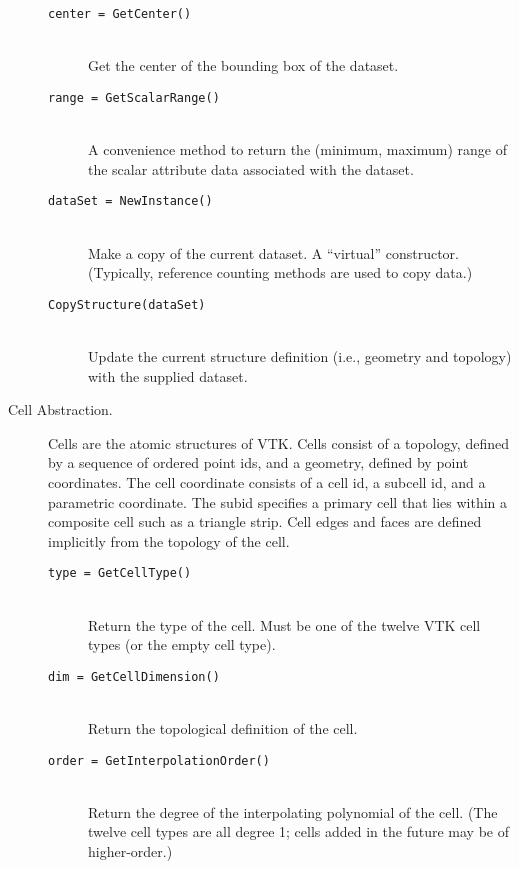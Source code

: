 \begin{description}
\begin{description}
    \item[\texttt{center = GetCenter()}] \hfill \\
    Get the center of the bounding box of the dataset.

    \item[\texttt{range = GetScalarRange()}] \hfill \\
    A convenience method to return the (minimum, maximum) range of the scalar attribute data associated with the dataset.

    \item[\texttt{dataSet = NewInstance()}] \hfill \\
    Make a copy of the current dataset. A ``virtual'' constructor. (Typically, reference counting methods are used to copy data.)

    \item[\texttt{CopyStructure(dataSet)}] \hfill \\
    Update the current structure definition (i.e., geometry and topology) with the supplied dataset.
    \end{description}


\item[Cell Abstraction.] Cells are the atomic structures of VTK. Cells consist of a topology, defined by a sequence of ordered point ids, and a geometry, defined by point coordinates. The cell coordinate consists of a cell id, a subcell id, and a parametric coordinate. The subid specifies a primary cell that lies within a composite cell such as a triangle strip. Cell edges and faces are defined implicitly from the topology of the cell.
    \begin{description}

    \item[\texttt{type = GetCellType()}] \hfill \\
    Return the type of the cell. Must be one of the twelve VTK cell types (or the empty cell type).

    \item[\texttt{dim = GetCellDimension()}] \hfill \\
    Return the topological definition of the cell.

    \item[\texttt{order = GetInterpolationOrder()}] \hfill \\
    Return the degree of the interpolating polynomial of the cell. (The twelve cell types are all degree 1; cells added in the future may be of higher-order.)


\end{description}
\end{description}
